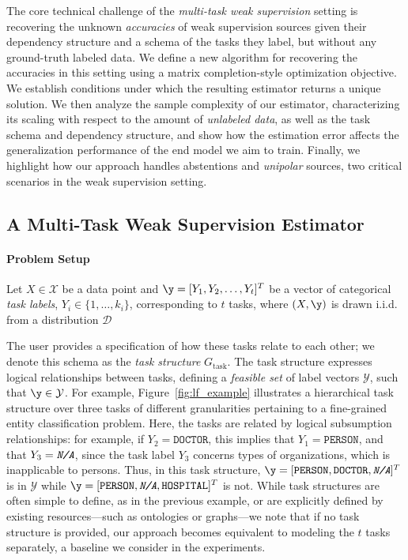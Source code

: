 \documentclass[letterpaper]{article}
\begin{document}
The core technical challenge of the \textit{multi-task weak supervision} setting is recovering the unknown \textit{accuracies} of weak supervision sources given their dependency structure and a schema of the tasks they label, but without any ground-truth labeled data.
We define a new algorithm for recovering the accuracies in this setting using a matrix completion-style optimization objective.
We establish conditions under which the resulting estimator returns a unique solution.
We then analyze the sample complexity of our estimator, characterizing its scaling with respect to the amount of \textit{unlabeled data}, as well as the task schema and dependency structure, and show how the estimation error affects the generalization performance of the end model we aim to train.
Finally, we highlight how our approach handles abstentions and \textit{unipolar} sources, two critical scenarios in the weak supervision setting.

\subsection{A Multi-Task Weak Supervision Estimator}

\paragraph*{Problem Setup}
Let $X \in \mathcal{X}$ be a data point and $\y = [Y_1, Y_2, \ldots, Y_t]^T$ be a vector of categorical \textit{task labels}, $Y_i \in \{ 1,\ldots,k_i \}$, corresponding to $t$ tasks, where $(X,\y)$ is drawn i.i.d. from a distribution $\mathcal{D}$

The user provides a specification of how these tasks relate to each other; we denote this schema as the \textit{task structure} $G_{\text{task}}$.
The task structure expresses logical relationships between tasks, defining a \textit{feasible set} of label vectors $\mathcal{Y}$, such that $\y \in \mathcal{Y}$.
For example, Figure~\ref{fig:lf_example} illustrates a hierarchical task structure over three tasks of different granularities pertaining to a fine-grained entity classification problem.
Here, the tasks are related by logical subsumption relationships: for example, if $Y_2 = \texttt{DOCTOR}$, this implies that $Y_1 = \texttt{PERSON}$, and that $Y_3 = \textit{\texttt{N/A}}$, since the task label $Y_3$ concerns types of organizations, which is inapplicable to persons.
Thus, in this task structure, $\y = [\texttt{PERSON}, \texttt{DOCTOR}, \textit{\texttt{N/A}}]^T$ is in $\mathcal{Y}$ while $\y = [\texttt{PERSON}, \textit{\texttt{N/A}}, \texttt{HOSPITAL}]^T$ is not.
While task structures are often simple to define, as in the previous example, or are explicitly defined by existing resources---such as ontologies or graphs---we note that if no task structure is provided, our approach becomes equivalent to modeling the $t$ tasks separately, a baseline we consider in the experiments.
\end{document}
